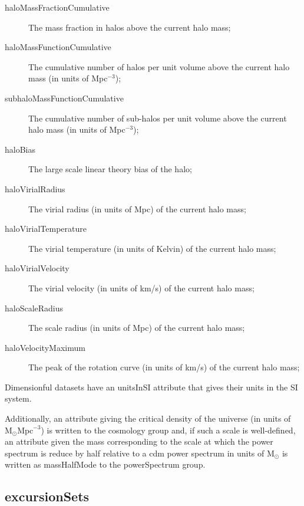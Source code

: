 \begin{description}
\item [{\normalfont \ttfamily haloMassFractionCumulative}] The mass fraction in halos above the current halo mass;
\item [{\normalfont \ttfamily haloMassFunctionCumulative}] The cumulative number of halos per unit volume above the current halo mass (in units of Mpc$^{-3}$);
\item [{\normalfont \ttfamily subhaloMassFunctionCumulative}] The cumulative number of sub-halos per unit volume above the current halo mass (in units of Mpc$^{-3}$);
\item [{\normalfont \ttfamily haloBias}] The large scale linear theory bias of the halo;
\item [{\normalfont \ttfamily haloVirialRadius}] The virial radius (in units of Mpc) of the current halo mass;
\item [{\normalfont \ttfamily haloVirialTemperature}] The virial temperature (in units of Kelvin) of the current halo mass;
\item [{\normalfont \ttfamily haloVirialVelocity}] The virial velocity (in units of km/s) of the current halo mass;
\item [{\normalfont \ttfamily haloScaleRadius}] The scale radius (in units of Mpc) of the current halo mass;
\item [{\normalfont \ttfamily haloVelocityMaximum}] The peak of the rotation curve (in units of km/s) of the current halo mass;
\end{description}
Dimensionful datasets have an {\normalfont \ttfamily unitsInSI} attribute that gives their units in the SI system.

Additionally, an attribute giving the critical density of the universe (in units of $\mathrm{M}_\odot \mathrm{Mpc}^{-3}$) is written to the {\normalfont \ttfamily cosmology} group and, if such a scale is well-defined, an attribute given the mass corresponding to the scale at which the power spectrum is reduce by half relative to a \gls{cdm} power spectrum in units of $\mathrm{M}_\odot$ is written as {\normalfont \ttfamily massHalfMode} to the {\normalfont \ttfamily powerSpectrum} group.

\subsection{{\normalfont \ttfamily excursionSets}}

